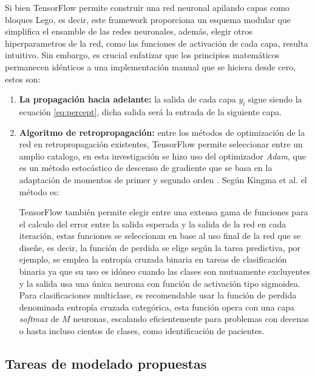 \documentclass[12pt,letterpaper,oneside,openright]{book}
\begin{document}
Si bien TensorFlow permite construir una red neuronal apilando capas como bloques Lego, es decir, este framework proporciona un esquema modular que simplifica el ensamble de las redes neuronales, además, elegir otros hiperparametros de la red, como las funciones de activación de cada capa, resulta intuitivo. Sin embargo, es crucial enfatizar que los principios matemáticos permanecen idénticos a una implementación manual que se hiciera desde cero, estos son: 
\begin{enumerate}
	\item \textbf{La propagación hacia adelante:} la salida de cada capa $y_l$ sigue siendo la ecuación \ref{eq:percept}, dicha salida será la entrada de la siguiente capa. 
	\item \textbf{Algoritmo de retropropagación:} entre los métodos de optimización de la red en retropropagación existentes, TensorFlow permite seleccionar entre un amplio catalogo, en esta investigación se hizo uso del optimizador \emph{Adam}, que es un método estocástico de descenso de gradiente que se basa en la adaptación de momentos de primer y segundo orden \cite{keras15}. Según Kingma et al. \cite{adamoptimization14} el método es: \begin{quote}
	\end{quote}
	TensorFlow también permite elegir entre una extensa gama de funciones para el calculo del error entre la salida esperada y la salida de la red en cada iteración, estas funciones se seleccionan en base al uso final de la red que se diseñe, es decir, la función de perdida se elige según la tarea predictiva, por ejemplo, se emplea la entropía cruzada binaria en tareas de clasificación binaria ya que su uso es idóneo cuando las clases son mutuamente excluyentes y la salida usa una única neurona con función de activación tipo sigmoidea. Para clasificaciones multiclase, es recomendable usar la función de perdida denominada entropía cruzada categórica, esta función opera con una capa \emph{softmax} de $M$ neuronas, escalando eficientemente para problemas con decenas o hasta incluso cientos de clases, como identificación de pacientes.
\end{enumerate}

\subsection{Tareas de modelado propuestas} \label{subsec:tareas_modelado}
\end{document}

